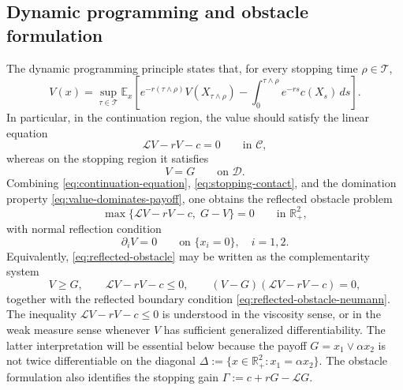 \documentclass[pdflatex,sn-mathphys-num]{sn-jnl}
\theoremstyle{plain}
\theoremstyle{definition}
\theoremstyle{remark}
\numberwithin{equation}{section}
\begin{document}
\subsection{Dynamic programming and obstacle formulation} \label{subsec:dpp-obstacle} 
The dynamic programming principle states that, for every stopping time \(\rho\in\mathcal T\), 
\begin{equation} \label{eq:dpp} 
V(x) = \sup_{\tau\in\mathcal T} \mathbb E_x \left[ e^{-r(\tau\wedge\rho)}V(X_{\tau\wedge\rho}) - \int_0^{\tau\wedge\rho}e^{-rs}c(X_s)\,ds \right]. 
\end{equation} 
In particular, in the continuation region, the value should satisfy the linear equation 
\begin{equation} \label{eq:continuation-equation} 
\mathcal LV-rV-c=0 \qquad \text{in }\mathcal C, 
\end{equation} 
whereas on the stopping region it satisfies 
\begin{equation} \label{eq:stopping-contact} 
V=G \qquad \text{on }\mathcal D. 
\end{equation} 
Combining \eqref{eq:continuation-equation}, \eqref{eq:stopping-contact}, and the domination property \eqref{eq:value-dominates-payoff}, one obtains the reflected obstacle problem 
\begin{equation} \label{eq:reflected-obstacle} 
\max\big\{ \mathcal LV-rV-c,\;G-V \big\}=0 \qquad \text{in }\mathbb R_+^2, \end{equation} 
with normal reflection condition 
\begin{equation} \label{eq:reflected-obstacle-neumann} 
\partial_i V=0 \qquad \text{on }\{x_i=0\},\quad i=1,2 . 
\end{equation} 
Equivalently, \eqref{eq:reflected-obstacle} may be written as the complementarity system \begin{equation} \label{eq:complementarity} V\ge G,\qquad \mathcal LV-rV-c\le0,\qquad (V-G)(\mathcal LV-rV-c)=0, \end{equation} together with the reflected boundary condition \eqref{eq:reflected-obstacle-neumann}. The inequality 
$\displaystyle \mathcal LV-rV-c\le0$ is understood in the viscosity sense, or in the weak measure sense whenever \(V\) has sufficient generalized differentiability. The latter interpretation will be essential below because the payoff \(G=x_1\vee\alpha x_2\) is not twice differentiable on the diagonal 
$\displaystyle \Delta:=\{x\in\mathbb R_+^2:x_1=\alpha x_2\}$. 
The obstacle formulation also identifies the stopping gain  
$\displaystyle \Gamma:=c+rG-\mathcal LG $. 
\end{document}
